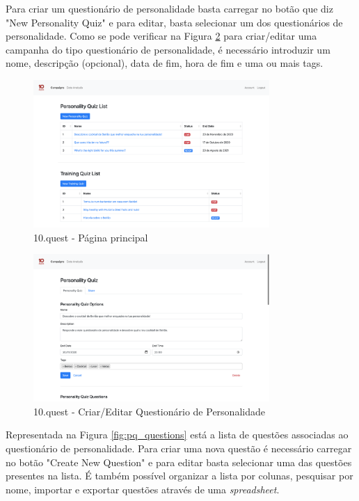 Para criar um questionário de personalidade basta carregar no botão que diz "New Personality Quiz" e para editar, basta selecionar um dos questionários de personalidade. Como se pode verificar na Figura \ref{fig:pq} para criar/editar uma campanha do tipo questionário de personalidade, é necessário introduzir um nome, descripção (opcional), data de fim, hora de fim e uma ou mais tags.

\begin{figure}[ht!]
	\begin{center}
		\includegraphics[width=0.8\textwidth]{img/product/homepage}
		\caption{10.quest - Página principal}
		\label{fig:home}
	\end{center}
\end{figure}

\begin{figure}[ht!]
	\begin{center}
		\includegraphics[width=0.8\textwidth]{img/product/pq}
		\caption{10.quest - Criar/Editar Questionário de Personalidade}
		\label{fig:pq}
	\end{center}
\end{figure}
\newpage


Representada na Figura \ref{fig:pq_questions} está a lista de questões associadas ao questionário de personalidade. Para criar uma nova questão é necessário carregar no botão "Create New Question" e para editar basta selecionar uma das questões presentes na lista. É também possível organizar a lista por colunas, pesquisar por nome, importar e exportar questões através de uma \textit{spreadsheet}.

